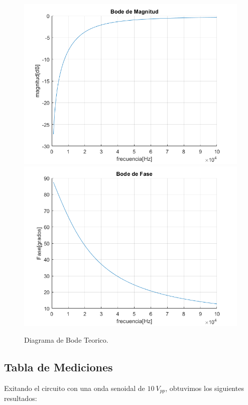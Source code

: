 \begin{figure}[h!]
\centering
\includegraphics[scale=0.5]{2teomag.png}
\includegraphics[scale=0.5]{2teofase.png}
\caption{Diagrama de Bode Teorico.}
\label{fig:CR}
\end{figure}

\subsection{Tabla de Mediciones}

Exitando el circuito con una onda senoidal de $10~V_{pp}$, obtuvimos los siguientes resultados:


